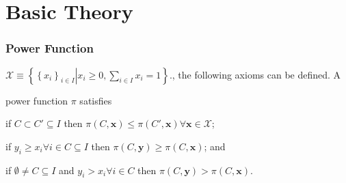 \documentclass{beamer}
\makeatletter
\def\mcolor#1#2{\rule{0ex}{0ex}\color{#1}#2\color{black}{}}
\newcommand{\IffDef}{:\Leftrightarrow}
\def\Quant#1#2{\begin{array}[t]{@{}c@{}}#1 \\[-1ex] \scriptstyle #2 \end{array}\;}
\def\QuantCond#1#2#3{\begin{array}[t]{@{}c@{}}#1 \\[-1ex] \scriptstyle #2 \\[-1ex]\scriptstyle #3 \end{array}\;}
\def\ForAll#1{\Quant{\forall}{#1}}
\def\ForAllCond#1#2{\QuantCond{\forall}{#1}{#2}}
\newcommand{\NN}{\mathbb{N}}
\newenvironment{flist}{\begin{array}{@{}ll@{}}}{\end{array}}
\newenvironment{Envanybound}[4]{\vspace{0.3ex}\par\noindent \textbf{#1}[``#2'', any[$#3$], %
  bound[$#4$], \\[0.5ex]\makebox[5mm]{}
  \begin{math}\begin{flist}}{\end{flist}]%
  \end{math}\vspace{0.3ex}\rmfamily}
\makeatother
\begin{document}
\section{Basic Theory}
\begin{frame}
\frametitle{Power Function}
$\mathcal{X} \equiv \left\{ \left\{ x_i \right\}_{i \in I} \left|
    x_i \ge 0, \sum_{i \in I} x_i = 1 \right.\right\}$., the following
axioms can be defined. 
 A \mcolor{blue}{power function} $\pi$ satisfies\bigskip

\begin{description}[WC]
  \item[\mcolor{red}{WC}]\qquad if $C \subset C' \subseteq I$ then $\pi \left( C, \bm{x} \right) \le \pi \left( C', \bm{x} \right) \forall \bm{x} \in \mathcal{X}$;\pause

  \item[\mcolor{red}{WR}]\qquad if $y_i \ge x_i \forall i \in C \subseteq I$ then $\pi \left( C, \bm{y} \right) \ge \pi \left( C, \bm{x} \right)$; \pause and

  \item[\mcolor{red}{SR}]\qquad if $\emptyset \ne C \subseteq I$ and $y_i > x_i \forall i \in C$ then $\pi \left( C, \bm{y} \right) > \pi \left( C, \bm{x} \right)$.
\end{description}
\end{frame}



\end{document}
